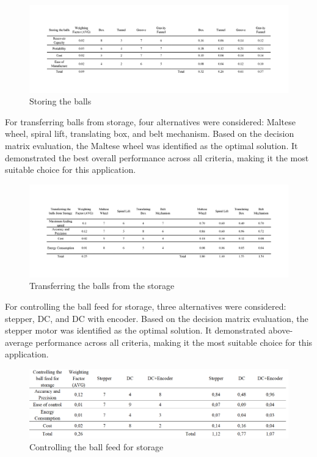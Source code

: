\documentclass[12pt]{report}
\begin{document}
\begin{figure}[H]
    \centering
    \includegraphics[width=1\textwidth]{Decision matrices/storing.png}
    \caption{Storing the balls}
\end{figure}
For transferring balls from storage, four alternatives were considered: Maltese wheel, spiral lift, translating box, and belt mechanism. Based on the decision matrix evaluation, the Maltese wheel was identified as the optimal solution. It demonstrated the best overall performance across all criteria, making it the most suitable choice for this application.

\begin{figure}[H]
    \centering
    \includegraphics[width=1\textwidth]{Decision matrices/transfer from storage.png}
    \caption{Transferring the balls from  the storage} 
\end{figure}

For controlling the ball feed for storage, three alternatives were considered: stepper, DC, and DC with encoder. Based on the decision matrix evaluation, the stepper motor was identified as the optimal solution. It demonstrated above-average performance across all criteria, making it the most suitable choice for this application.

\begin{figure}[H]
    \centering
    \includegraphics[width=1\textwidth]{Decision matrices/controlling ball feed for storage.png}
    \caption{Controlling the ball feed for storage}
\end{figure}
\end{document}
